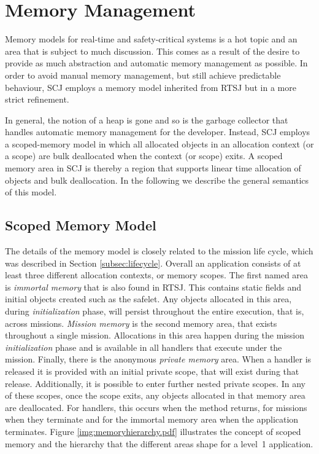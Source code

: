 \section{Memory Management}
\label{section:memoryManagement}
Memory models for real-time and safety-critical systems is a hot topic and an area that is subject to much discussion. This comes as a result of the desire to provide as much abstraction and automatic memory management as possible. In order to avoid manual memory management, but still achieve predictable behaviour, SCJ employs a memory model inherited from RTSJ but in a more strict refinement.

In general, the notion of a heap is gone and so is the garbage collector that handles automatic memory management for the developer. Instead, SCJ employs a scoped-memory model in which all allocated objects in an allocation context (or a scope) are bulk deallocated when the context (or scope) exits. A scoped memory area in SCJ is thereby a region that supports linear time allocation of objects and bulk deallocation\cite{Schoeberl:2007:GCS:1288940.1288953}. In the following we describe the general semantics of this model.

\subsection{Scoped Memory Model} %
\label{sub:scoped_memory_model}
The details of the memory model is closely related to the mission life cycle, which was described in Section \ref{subsec:lifecycle}. Overall an application consists of at least three different allocation contexts, or memory scopes. The first named area is \textit{immortal memory} that is also found in RTSJ. This contains static fields and initial objects created such as the safelet. Any objects allocated in this area, during \textit{initialization} phase, will persist throughout the entire execution, that is, across missions. \textit{Mission memory} is the second memory area, that exists throughout a single mission. Allocations in this area happen during the mission \textit{initialization} phase and is available in all handlers that execute under the mission. Finally, there is the anonymous \textit{private memory} area. When a handler is released it is provided with an initial private scope, that will exist during that release. Additionally, it is possible to enter further nested private scopes. In any of these scopes, once the scope exits, any objects allocated in that memory area are deallocated. For handlers, this occurs when the  method returns, for missions when they terminate and for the immortal memory area when the application terminates. Figure \ref{img:memoryhierarchy.pdf} illustrates the concept of scoped memory and the hierarchy that the different areas shape for a level~1 application.

